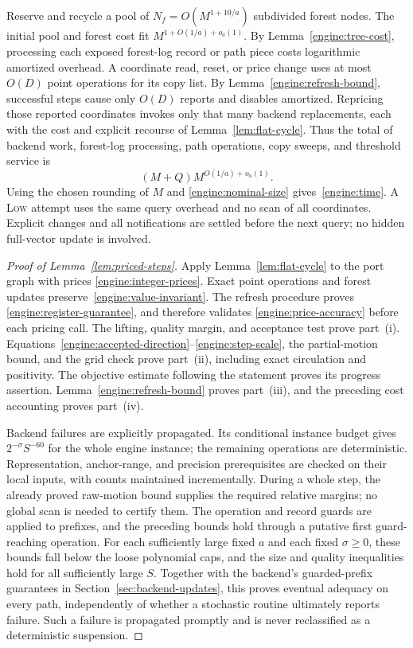 Reserve and recycle a pool of
$N_f=O(M^{1+10/a})$ subdivided forest nodes.  The initial pool and forest
cost fit $M^{1+O(1/a)+o_a(1)}$.  By
Lemma~\ref{engine:tree-cost}, processing each exposed forest-log record
or path piece costs logarithmic amortized overhead.  A coordinate read,
reset, or price change uses at most $O(D)$ point operations for its copy
list.  By Lemma~\ref{engine:refresh-bound}, successful steps cause only
$O(D)$ reports and disables amortized.  Repricing those reported
coordinates invokes only that many backend replacements, each with the
cost and explicit recourse of Lemma~\ref{lem:flat-cycle}.  Thus the total
of backend work, forest-log processing, path operations, copy sweeps,
and threshold service is
\[
                   (M+Q)M^{O(1/a)+o_a(1)}.
\]
Using the chosen rounding of $M$ and
\eqref{engine:nominal-size} gives~\eqref{engine:time}.  A
\textsc{Low} attempt uses the same query overhead and no scan of all
coordinates.  Explicit changes and all notifications are settled before
the next query; no hidden full-vector update is involved.

\begin{proof}[Proof of Lemma~\ref{lem:priced-steps}]
Apply Lemma~\ref{lem:flat-cycle} to the port graph with prices
\eqref{engine:integer-prices}.  Exact point operations and forest updates
preserve~\eqref{engine:value-invariant}.  The refresh procedure proves
\eqref{engine:register-guarantee}, and therefore validates
\eqref{engine:price-accuracy} before each pricing call.  The lifting,
quality margin, and acceptance test prove part~\textup{(i)}.
Equations~\eqref{engine:accepted-direction}--\eqref{engine:step-scale},
the partial-motion bound, and the grid check prove part~\textup{(ii)},
including exact circulation and positivity.  The objective estimate
following the statement proves its progress assertion.
Lemma~\ref{engine:refresh-bound} proves part~\textup{(iii)}, and the
preceding cost accounting proves part~\textup{(iv)}.

Backend failures are explicitly propagated.  Its conditional instance
budget gives $2^{-\sigma}S^{-60}$ for the whole engine instance; the
remaining operations are deterministic.  Representation, anchor-range,
and precision prerequisites are checked on their local inputs, with
counts maintained incrementally.  During a whole step, the already
proved raw-motion bound supplies the required relative margins; no
global scan is needed to certify them.  The operation and record guards
are applied to prefixes, and the preceding bounds hold through a
putative first guard-reaching operation.  For each sufficiently large
fixed $a$ and each fixed $\sigma\ge0$, these bounds fall below the loose polynomial caps, and
the size and quality inequalities hold for all sufficiently large $S$.
Together with the backend's guarded-prefix guarantees in
Section~\ref{sec:backend-updates}, this proves eventual adequacy on
every path, independently of whether a stochastic routine ultimately
reports failure.  Such a failure is propagated promptly and is never
reclassified as a deterministic suspension.
\end{proof}
